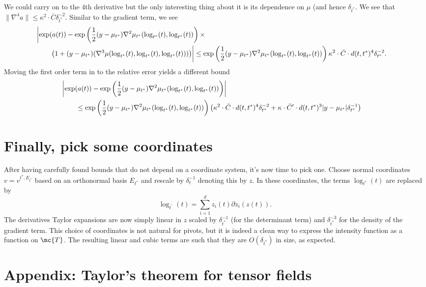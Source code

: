 \documentclass{article}
\begin{document}
We could carry on to the 4th derivative but the only interesting thing about it is its dependence on $\mu$ (and hence $\delta_{t^*}$. We see that $\|\nabla^4 a\| \leq \kappa^2 \cdot \bar{C} \delta_{t^*}^{-2}$.
Similar to the gradient term, we see
$$
\begin{aligned}
  \lefteqn{\biggl|\exp(a(t)) - \exp\left(\frac{1}{2}(y-\mu_{t^*}) \nabla^2 \mu_{t^*}(\log_{t^*}(t), \log_{t^*}(t))\right) \times} \\
  & \qquad \left(1 + (y - \mu_{t^*})( \nabla^3 \mu(\log_{t^*}(t), \log_{t^*}(t) ,\log_{t^*}(t))) \right)\biggr|
  \leq \exp\left(\frac{1}{2}(y-\mu_{t^*}) \nabla^2 \mu_{t^*}(\log_{t^*}(t), \log_{t^*}(t))\right) \kappa^2 \cdot \bar{C} \cdot d(t,t^*)^4 \delta_{t^*}^{-2}.
\end{aligned}
$$
Moving the first order term in to the relative error yields a different bound
$$
\begin{aligned}
  \lefteqn{\biggl|\exp(a(t)) - \exp\left(\frac{1}{2}(y-\mu_{t^*}) \nabla^2 \mu_{t^*}(\log_{t^*}(t), \log_{t^*}(t))\right)\biggr|} \\
  & \qquad 
  \leq \exp\left(\frac{1}{2}(y-\mu_{t^*}) \nabla^2 \mu_{t^*}(\log_{t^*}(t), \log_{t^*}(t))\right) \left(\kappa^2 \cdot \bar{C} \cdot d(t,t^*)^4 \delta_{t^*}^{-2} +  \kappa \cdot \bar{C}' \cdot d(t,t^*)^3 |y - \mu_{t^*}| \delta_{t^*}^{-1} \right)
\end{aligned}
$$

\section{Finally, pick some coordinates}

After having carefully found bounds that do not depend on a coordinate system, it's now time to pick one. Choose
normal coordinates $v=v^{t^*,E_{t^*}}$ based on an orthonormal basis $E_{t^*}$ and rescale by $\delta_t^{-1}$ denoting this by $z$. In these coordinates, the terms $\log_{t^*}(t)$ are replaced by
$$
\log_{t^^*}(t) = \sum_{i=1}^d z_i(t) \partial z_i(z(t)).
$$
The derivatives Taylor expansions are now simply linear in $z$ scaled by $\delta_{t^*}^{-1}$
(for the determinant term) and $\delta_{t^*}^{-3}$ for the density of the gradient term. This choice of coordinates is not natural for 
pivots, but it is indeed a clean way to express the intensity function as a function on $\mc{T}$. The resulting
linear and cubic terms are such that they are $O(\delta_{t^*})$ in size, as expected. 

 

\section{Appendix: Taylor's theorem for tensor fields}
\end{document}
